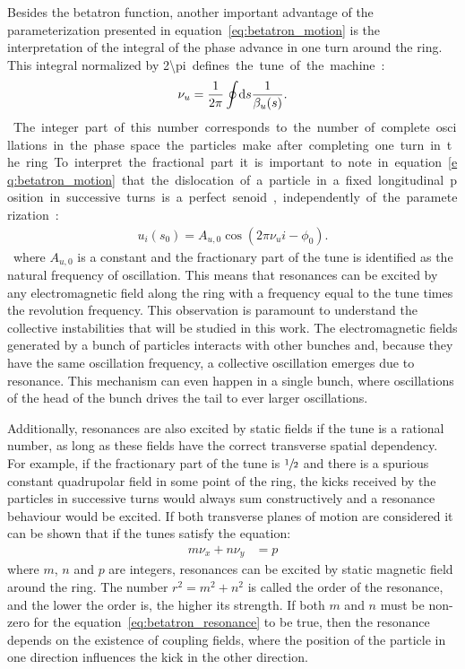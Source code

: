 	Besides the betatron function, another important advantage of the parameterization presented in equation~\eqref{eq:betatron_motion} is the interpretation of the integral of the phase advance in one turn around the ring. This integral normalized by \SI{2\pi} defines the tune of the machine:
	\begin{align}
		\nu_u = \frac{1}{2\pi}\oint\!\text{d}s \frac{1}{\beta_u(s)}.
	\end{align}
	The integer part of this number corresponds to the number of complete oscillations in the phase space the particles make after completing one turn in the ring. To interpret the fractional part it is important to note in equation~\eqref{eq:betatron_motion} that the dislocation of a particle in a fixed longitudinal position in successive turns is a perfect senoid, independently of the parameterization:
	\begin{align}
		u_i(s_0) = A_{u,0}\cos(2\pi\nu_u i -\phi_0).
	\end{align}
	where $A_{u,0}$ is a constant and the fractionary part of the tune is identified as the natural frequency of oscillation. This means that resonances can be excited by any electromagnetic field along the ring with a frequency equal to the tune times the revolution frequency. This observation is paramount to understand the collective instabilities that will be studied in this work. The electromagnetic fields generated by a bunch of particles interacts with other bunches and, because they have the same oscillation frequency, a collective oscillation emerges due to resonance. This mechanism can even happen in a single bunch, where oscillations of the head of the bunch drives the tail to ever larger oscillations.

	Additionally, resonances are also excited by static fields if the tune is a rational number, as long as these fields have the correct transverse spatial dependency. For example, if the fractionary part of the tune is $\sfrac12$ and there is a spurious constant quadrupolar field in some point of the ring, the kicks received by the particles in successive turns would always sum constructively and a resonance behaviour would be excited. If both transverse planes of motion are considered it can be shown that if the tunes satisfy the equation:
	\begin{align}\label{eq:betatron_resonance}
		m\nu_x + n\nu_y &= p
	\end{align}
	where $m$, $n$ and $p$ are integers, resonances can be excited by static magnetic field around the ring. The number $r^2 = m^2 + n^2$ is called the order of the resonance, and the lower the order is, the higher its strength. If both $m$ and $n$ must be non-zero for the equation~\eqref{eq:betatron_resonance} to be true, then the resonance depends on the existence of coupling fields, where the position of the particle in one direction influences the kick in the other direction.

